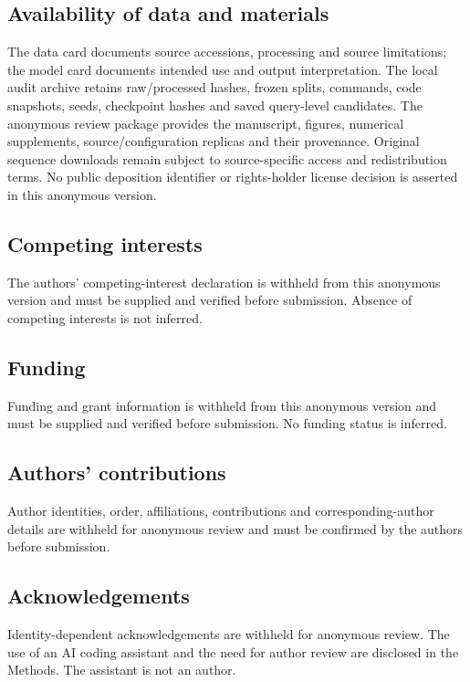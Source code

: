 \documentclass[10pt]{article}
\begin{document}
\subsection*{Availability of data and materials}
The data card documents source accessions, processing and source limitations;
the model card documents intended use and output interpretation. The local
audit archive retains raw/processed hashes, frozen splits, commands, code
snapshots, seeds, checkpoint hashes and saved query-level candidates. The
anonymous review package provides the manuscript, figures, numerical
supplements, source/configuration replicas and their provenance. Original
sequence downloads remain subject to source-specific access and redistribution
terms. No public deposition identifier or rights-holder license decision is
asserted in this anonymous version.

\subsection*{Competing interests}
The authors' competing-interest declaration is withheld from this anonymous
version and must be supplied and verified before submission. Absence of
competing interests is not inferred.

\subsection*{Funding}
Funding and grant information is withheld from this anonymous version and must
be supplied and verified before submission. No funding status is inferred.

\subsection*{Authors' contributions}
Author identities, order, affiliations, contributions and corresponding-author
details are withheld for anonymous review and must be confirmed by the authors
before submission.

\subsection*{Acknowledgements}
Identity-dependent acknowledgements are withheld for anonymous review. The use
of an AI coding assistant and the need for author review are disclosed in the
Methods. The assistant is not an author.
\end{document}

